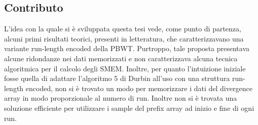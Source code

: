 \documentclass[a4paper,11pt, oneside,italian]{article}
\begin{document}
\subsection*{Contributo}
L'idea con la quale si è sviluppata questa tesi vede, come punto di partenza,
alcuni primi risultati teorici, presenti in letteratura, che caratterizzavano
una variante run-length encoded della PBWT. Purtroppo, tale proposta presentava
alcune ridondanze nei dati memorizzati e non caratterizzava alcuna tecnica
algoritmica per il calcolo degli SMEM.
Inoltre, per quanto l'intuizione iniziale fosse quella di adattare l'algoritmo 5
di Durbin all'uso con una struttura run-length encoded, non si è trovato un modo
per memorizzare i dati del divergence array in modo proporzionale al numero di
run. Inoltre non si è trovata una soluzione efficiente per utilizzare i sample
del prefix array ad inizio e fine di ogni run.
\end{document}
